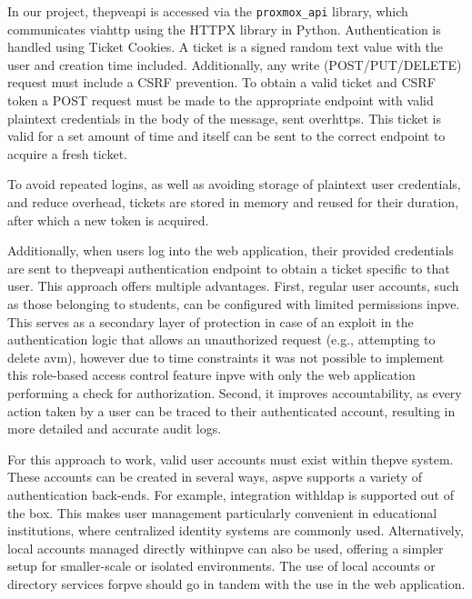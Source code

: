     In our project, the\ac{pve}\ac{api} is accessed via the \texttt{proxmox\_api} library, which communicates via\ac{http} 
    using the HTTPX library in Python. Authentication is handled using Ticket Cookies. A ticket is a signed random text 
    value with the user and creation time included. Additionally, any write (POST/PUT/DELETE) request must include a CSRF 
    prevention. To obtain a valid ticket and CSRF token a POST request must be made to the appropriate endpoint with valid 
    plaintext credentials in the body of the message, sent over\ac{https}. This ticket is valid for a set amount of time and 
    itself can be sent to the correct endpoint to acquire a fresh ticket.

    To avoid repeated logins, as well as avoiding storage of plaintext user credentials, and reduce overhead, tickets are 
    stored in memory and reused for their duration, after which a new token is acquired.

    Additionally, when users log into the web application, their provided credentials are sent to the\ac{pve}\ac{api} 
    authentication endpoint to obtain a ticket specific to that user. This approach offers multiple advantages. 
    First, regular user accounts, such as those belonging to students, can be configured with limited permissions in\ac{pve}. 
    This serves as a secondary layer of protection in case of an exploit in the authentication logic that allows an unauthorized 
    request (e.g., attempting to delete a\ac{vm}), however due to time constraints it was not possible to implement this 
    role-based access control feature in\ac{pve} with only the web application performing a check for authorization. Second, 
    it improves accountability, as every action taken by a user can be traced to their authenticated account, resulting in 
    more detailed and accurate audit logs.

    For this approach to work, valid user accounts must exist within the\ac{pve} system. These accounts can be created in 
    several ways, as\ac{pve} supports a variety of authentication back-ends. For example, integration with\ac{ldap} is 
    supported out of the box. This makes user management particularly convenient in educational institutions, where 
    centralized identity systems are commonly used. Alternatively, local accounts managed directly within\ac{pve} 
    can also be used, offering a simpler setup for smaller-scale or isolated environments. The use of local accounts 
    or directory services for\ac{pve} should go in tandem with the use in the web application.

